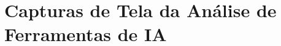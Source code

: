 \appendix
\chapter{Capturas de Tela da Análise de Ferramentas de IA}
\label{ap.telasIA}













